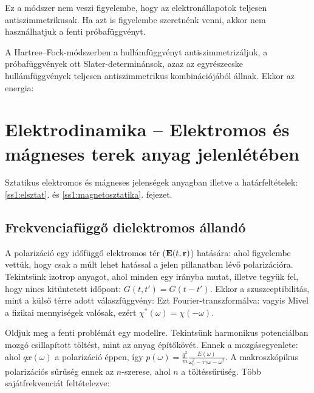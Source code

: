   Ez a módszer nem veszi figyelembe, hogy az elektronállapotok teljesen antiszimmetrikusak. Ha azt is figyelembe szeretnénk venni, akkor nem használhatjuk a fenti próbafüggvényt.
   
   A Hartree--Fock-módszerben a hullámfüggvényt antiszimmetrizáljuk, a próbafüggvények ott Sla\-ter-de\-ter\-mi\-nán\-sok, azaz az egyrészecske hullámfüggvények teljesen antiszimmetrikus kombinációjából állnak. Ekkor az energia:
   
 \section{Elektrodinamika -- Elektromos és mágneses terek anyag jelenlétében}
  
  Sztatikus elektromos és mágneses jelenségek anyagban illetve a határfeltételek: \ref{ss1:elsztat}. és \ref{ss1:magnetosztatika}. fejezet. 
  
  \subsection{Frekvenciafüggő dielektromos állandó}
   
   A polarizáció egy időfüggő elektromos tér ($\mathbf{E}(t,\mathbf{r})$) hatására:
   ahol figyelembe vettük, hogy csak a múlt lehet hatással a jelen pillanatban lévő polarizációra. Tekintsünk izotrop anyagot, ahol minden egy irányba mutat, illetve tegyük fel, hogy nincs kitüntetett időpont: $G(t,t')=G(t-t')$. Ekkor a szuszceptibilitás, mint a külső térre adott válaszfüggvény:
   Ezt Fourier-transzformálva:
   vagyis
   Mivel a fizikai mennyiségek valósak, ezért $\chi^*(\omega)=\chi(-\omega)$. 
   
   Oldjuk meg a fenti problémát egy modellre. Tekintsünk harmonikus potenciálban mozgó csillapított töltést, mint az anyag építőkövét. Ennek a mozgásegyenlete:
   ahol $qx(\omega)$ a polarizáció éppen, így $p(\omega)=\frac{q^2}{m}\frac{E(\omega)}{\omega_0^2-i\gamma\omega-\omega^2}$. A makroszkópikus polarizációs sűrűség ennek az $n$-szerese, ahol $n$ a töltéssűrűség. Több sajátfrekvenciát feltételezve:
   
